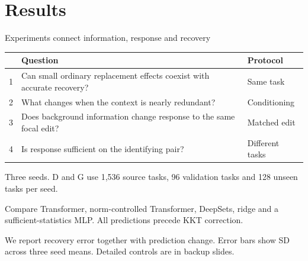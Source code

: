\documentclass[aspectratio=169,11pt]{beamer}
\newcommand{\source}[1]{\par\vfill{\color{muted}\tiny #1}}
\begin{document}
\section{Results}
\begin{frame}{Experiments connect information, response and recovery}
\begin{center}
\begin{tabular}{p{}p{}p{}}
\toprule
& Question & Protocol\\
\midrule
1 & Can small ordinary replacement effects coexist with accurate recovery? & Same task\\[2mm]
2 & What changes when the context is nearly redundant? & Conditioning\\[2mm]
3 & Does background information change response to the same focal edit? & Matched edit\\[2mm]
4 & Is response sufficient on the identifying pair? & Different tasks\\
\bottomrule
\end{tabular}
\end{center}
\vspace{1mm}
\small Three seeds. D and G use 1,536 source tasks,
96 validation tasks and 128 unseen tasks per seed.
\vspace{2mm}

\small Compare Transformer, norm-controlled Transformer, DeepSets,
ridge and a sufficient-statistics MLP. All predictions precede KKT correction.
\source{We report recovery error together with prediction change.
Error bars show SD across three seed means. Detailed controls are in backup slides.}
\end{frame}
\end{document}
